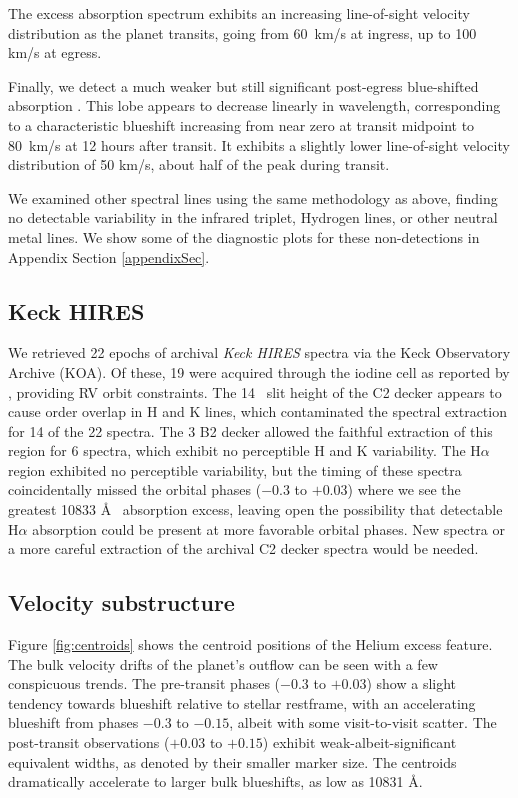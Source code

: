 \documentclass[linenumbers, twocolumn, trackchanges]{aastex631}
\begin{document}
The excess absorption spectrum exhibits an increasing line-of-sight velocity distribution as the planet transits, going from 60~km/s at ingress, up to 100 km/s at egress.

Finally, we detect a much weaker but still significant post-egress blue-shifted absorption .  This lobe appears to decrease linearly in wavelength, corresponding to a characteristic blueshift increasing from near zero at transit midpoint to 80~km/s at 12 hours after transit.  It exhibits a slightly lower line-of-sight velocity distribution of 50 km/s, about half of the peak during transit.

We examined other spectral lines using the same methodology as above, finding no detectable variability in the  infrared triplet, Hydrogen lines, or other neutral metal lines.  We show some of the diagnostic plots for these non-detections in Appendix Section \ref{appendixSec}.



\subsection{Keck HIRES}
We retrieved 22 epochs of archival \emph{Keck HIRES} spectra via the Keck Observatory Archive (KOA). Of these, 19 were acquired through the iodine cell as reported by \citet{2017AJ....153..211Z}, providing RV orbit constraints.  The 14\arcsec~ slit height of the C2 decker appears to cause order overlap in  H and K lines, which contaminated the spectral extraction for 14 of the 22 spectra.  The 3 B2 decker allowed the faithful extraction of this region for 6 spectra, which exhibit no perceptible  H and K variability.  The H$\alpha$ region exhibited no perceptible variability, but the timing of these spectra coincidentally missed the orbital phases ($-0.3$ to $+0.03$) where we see the greatest  10833 \AA~ absorption excess, leaving open the possibility that detectable H$\alpha$ absorption could be present at more favorable orbital phases.  New spectra or a more careful extraction of the archival C2 decker spectra would be needed.


\subsection{Velocity substructure}
Figure \ref{fig:centroids} shows the centroid positions of the Helium excess feature.  The bulk velocity drifts of the planet's outflow can be seen with a few conspicuous trends.  The pre-transit phases ($-0.3$ to $+0.03$) show a slight tendency towards blueshift relative to stellar restframe, with an accelerating blueshift from phases $-0.3$ to $-0.15$, albeit with some visit-to-visit scatter.  The post-transit observations ($+0.03$ to $+0.15$) exhibit weak-albeit-significant equivalent widths, as denoted by their smaller marker size.  The centroids dramatically accelerate to larger bulk blueshifts, as low as 10831 \AA.
\end{document}

